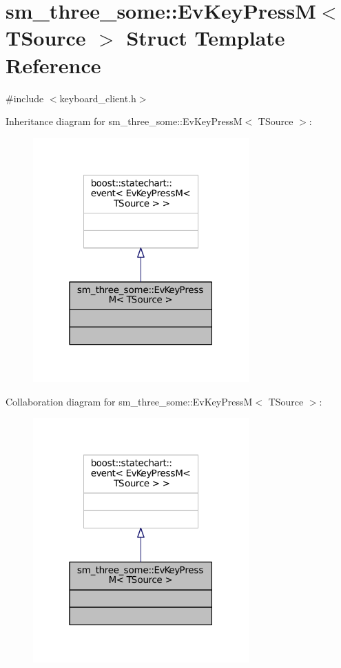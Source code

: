 \hypertarget{structsm__three__some_1_1EvKeyPressM}{}\section{sm\+\_\+three\+\_\+some\+:\+:Ev\+Key\+PressM$<$ T\+Source $>$ Struct Template Reference}
\label{structsm__three__some_1_1EvKeyPressM}


{\ttfamily \#include $<$keyboard\+\_\+client.\+h$>$}



Inheritance diagram for sm\+\_\+three\+\_\+some\+:\+:Ev\+Key\+PressM$<$ T\+Source $>$\+:
\nopagebreak
\begin{figure}[H]
\begin{center}
\leavevmode
\includegraphics[width=235pt]{structsm__three__some_1_1EvKeyPressM__inherit__graph}
\end{center}
\end{figure}


Collaboration diagram for sm\+\_\+three\+\_\+some\+:\+:Ev\+Key\+PressM$<$ T\+Source $>$\+:
\nopagebreak
\begin{figure}[H]
\begin{center}
\leavevmode
\includegraphics[width=235pt]{structsm__three__some_1_1EvKeyPressM__coll__graph}
\end{center}
\end{figure}


